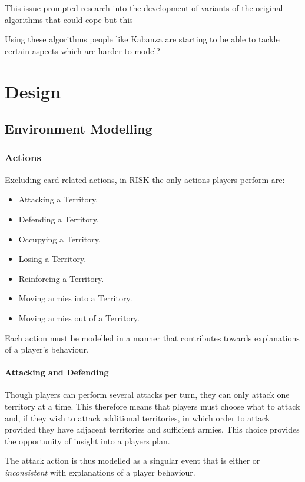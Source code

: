 \documentclass[parskip]{cs4rep}
\begin{document}
This issue prompted research into the development of variants of the original algorithms that could cope but this 

Using these algorithms people like Kabanza are starting to be able to tackle certain aspects which are harder to model?

\chapter{Design}

\section{Environment Modelling}

\subsection{Actions}

Excluding card related actions, in RISK the only actions players perform are:

\begin{itemize}
\item
Attacking a Territory.
\item
Defending a Territory.
\item
Occupying a Territory.
\item
Losing a Territory.
\item
Reinforcing a Territory.
\item
Moving armies into a Territory.
\item
Moving armies out of a Territory.
\end{itemize}

Each action must be modelled in a manner that contributes towards explanations of a player's behaviour.

\subsubsection{Attacking and Defending}

Though players can perform several attacks per turn, they can only attack one territory at a time. This therefore means that players must choose what to attack and, if they wish to attack additional territories, in which order to attack provided they have adjacent territories and sufficient armies. This choice provides the opportunity of insight into a players plan.

The attack action is thus modelled as a singular event that is either  or \textit{inconsistent} with explanations of a player behaviour.
\end{document}
